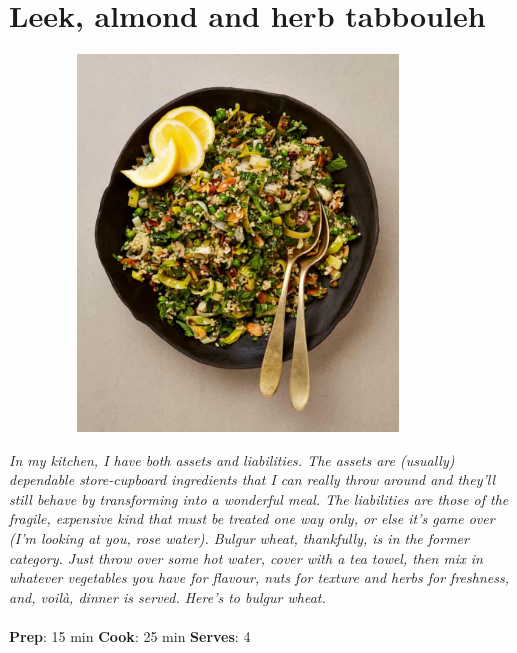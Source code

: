 \documentclass{book}
\begin{document}
\section{Leek, almond and herb tabbouleh}
\begin{figure}
\centering\includegraphics[width=10cm,height=10cm,keepaspectratio]{Recipe_Pictures/Leek,_almond_and_herb_tabbouleh.png}
\end{figure}
\emph{In my kitchen, I have both assets and liabilities. The assets are (usually) dependable store-cupboard ingredients that I can really throw around and they’ll still behave by transforming into a wonderful meal. The liabilities are those of the fragile, expensive kind that must be treated one way only, or else it’s game over (I’m looking at you, rose water). Bulgur wheat, thankfully, is in the former category. Just throw over some hot water, cover with a tea towel, then mix in whatever vegetables you have for flavour, nuts for texture and herbs for freshness, and, voilà, dinner is served. Here’s to bulgur wheat.}\\\\ 
\textbf{Prep}: 15 min
\textbf{Cook}: 25 min
\textbf{Serves}: 4
\end{document}
